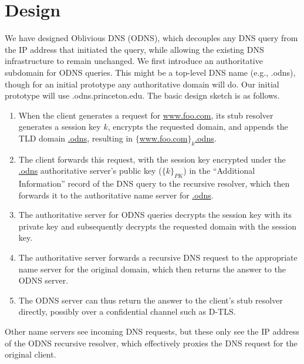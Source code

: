\section{Design}
\label{sec:design}

We have designed Oblivious DNS (ODNS), which decouples any DNS query from the IP address 
that initiated the query, while allowing the existing DNS infrastructure to remain 
unchanged.  We first introduce an authoritative subdomain for ODNS queries. This might 
be a top-level DNS name (e.g., .odns), though for an initial prototype any authoritative 
domain will do. Our initial prototype will use .odns.princeton.edu.  The basic design 
sketch is as follows.

\begin{enumerate}
\item When the client generates a request for \url{www.foo.com}, its stub resolver generates a session key $k$, encrypts the requested domain, and appends the TLD domain \url{.odns}, resulting in $\{$\url{www.foo.com}$\}_k$\url{.odns}. 
\item The client forwards this request, with the session key encrypted under the \url{.odns} authoritative server’s public key ($\{k\}_{PK}$) in the “Additional Information” record of the DNS query to the recursive resolver, which then forwards it to the authoritative name server for \url{.odns}.  
\item The authoritative server for ODNS queries decrypts the session key with its private key and subsequently decrypts the requested domain with the session key.  
\item The authoritative server forwards a recursive DNS request to the appropriate name server for the original domain, which then returns the answer to the ODNS server.
\item The ODNS server can thus return the answer to the client’s stub resolver directly, possibly over a confidential channel such as D-TLS.
\end{enumerate}

Other name servers see incoming DNS requests, but these only see the IP address of the ODNS recursive resolver, which effectively proxies the DNS request for the original client.

